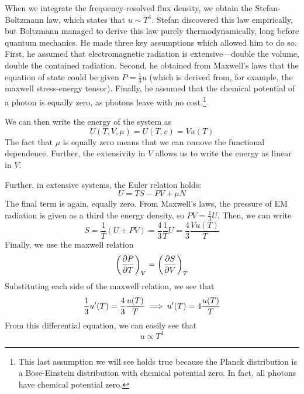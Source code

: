 \newpage
\begin{aside}
When we integrate the frequency-resolved flux density, we obtain the Stefan-Boltzmann law, which states that \(u\sim T^4\). Stefan discovered this law empirically, but Boltzmann managed to derive this law purely thermodynamically, long before quantum mechanics. He made three key assumptions which allowed him to do so. First, he assumed that electromagnetic radiation is extensive---double the volume, double the contained radiation. Second, he obtained from Maxwell's laws that the equation of state could be given \(P = \frac{1}{3}u\) (which is derived from, for example, the maxwell stress-energy tensor). Finally, he assumed that the chemical potential of a photon is equally zero, as photons leave with no cost.\footnote{This last assumption we will see holds true because the Planck distribution is a Bose-Einstein distribution with chemical potential zero. In fact, all photons have chemical potential zero.} 

We can then write the energy of the system as
\[U(T,V,\mu) = U(T,v) = Vu(T)\]
The fact that \(\mu\) is equally zero means that we can remove the functional dependence. Further, the extensivity in \(V\) allows us to write the energy as linear in \(V\).

Further, in extensive systems, the Euler relation holds:
\[U = TS-PV+\mu N\]
The final term is again, equally zero. From Maxwell's laws, the pressure of EM radiation is given as a third the energy density, so \(PV=\frac{1}{3}U\). Then, we can write
\[S = \frac{1}{T}\left(U+PV\right)=\frac{4}{3}\frac{1}{T}U = \frac{4}{3}\frac{Vu(T)}{T}\]
Finally, we use the maxwell relation
\[\left(\frac{\partial P}{\partial T}\right)_{V}=\left(\frac{\partial S}{\partial V}\right)_T\]
Substituting each side of the maxwell relation, we see that
\[\frac{1}{3}u'(T) = \frac{4}{3}\frac{u(T)}{T}\implies u'(T) = 4\frac{u(T)}{T}\]
From this differential equation, we can easily see that
\[u\propto T^4\]
\end{aside}
